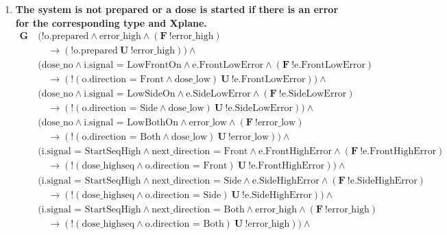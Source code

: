 \documentclass[a4paper,10pt]{article}
\newcommand{\LTLG}{\mathbf{G~}}
\newcommand{\LTLF}{\mathbf{F~}}
\newcommand{\LTLU}{\mathbf{~U~}}
\newcommand{\imply}{\rightarrow}
\newcommand{\doselow}{\textrm{dose\_low}}
\newcommand{\doseno}{\textrm{dose\_no}}
\newcommand{\dosehighseq}{\textrm{dose\_highseq}}
\newcommand{\errorlow}{\textrm{error\_low}}
\newcommand{\errorhigh}{\textrm{error\_high}}
\begin{document}
\begin{enumerate}
		\item \textbf{The system is not prepared or a dose is started if there is an error for the corresponding type and Xplane.} %
			\begin{align*}
				\LTLG &(!\textrm{o.prepared} \land \errorhigh \land (\LTLF !\errorhigh) \\
				&\hspace{1em}	\imply (!\textrm{o.prepared} \LTLU !\errorhigh)) \land \\
				& (\doseno \land \textrm{i.signal = LowFrontOn} \land \textrm{e.FrontLowError} \land (\LTLF !\textrm{e.FrontLowError}) \\
				&\hspace{1em}	\imply (!(\textrm{o.direction = Front} \land \doselow) \LTLU !\textrm{e.FrontLowError})) \land \\
				& (\doseno \land \textrm{i.signal = LowSideOn} \land \textrm{e.SideLowError} \land (\LTLF !\textrm{e.SideLowError}) \\
				&\hspace{1em}	\imply (!(\textrm{o.direction = Side} \land \doselow) \LTLU !\textrm{e.SideLowError})) \land \\
				& (\doseno \land \textrm{i.signal = LowBothOn} \land \errorlow \land (\LTLF !\errorlow) \\
				&\hspace{1em}	\imply (!(\textrm{o.direction = Both} \land \doselow) \LTLU !\errorlow)) \land \\
				& (\textrm{i.signal = StartSeqHigh} \land \textrm{next\_direction = Front} \land \textrm{e.FrontHighError} \land (\LTLF !\textrm{e.FrontHighError}) \\
				&\hspace{1em}	\imply (!(\dosehighseq \land \textrm{o.direction = Front}) \LTLU !\textrm{e.FrontHighError})) \land \\
				& (\textrm{i.signal = StartSeqHigh} \land \textrm{next\_direction = Side} \land \textrm{e.SideHighError} \land (\LTLF !\textrm{e.SideHighError}) \\
				&\hspace{1em}	\imply (!(\dosehighseq \land \textrm{o.direction = Side}) \LTLU !\textrm{e.SideHighError})) \land \\
				& (\textrm{i.signal = StartSeqHigh} \land \textrm{next\_direction = Both} \land \errorhigh \land (\LTLF !\errorhigh) \\
				&\hspace{1em}	\imply (!(\dosehighseq \land \textrm{o.direction = Both}) \LTLU !\errorhigh)) \land \\

\end{align*}
\end{enumerate}
\end{document}
